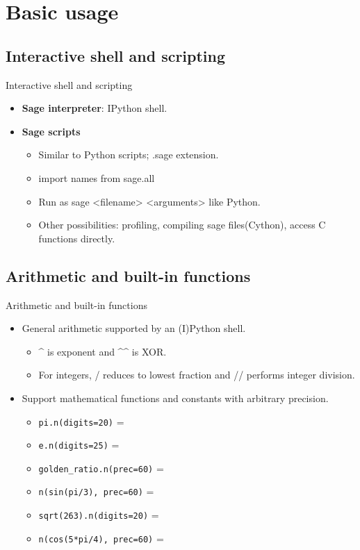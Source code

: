 \documentclass{beamer}
\begin{document}
\section{Basic usage}
\subsection{Interactive shell and scripting}
\begin{frame}{Interactive shell and scripting}
  \begin{itemize}
   \item \textbf{Sage interpreter}: IPython shell.
   \item \textbf{Sage scripts}
   \begin{itemize}
    \item Similar to Python scripts; .sage extension.
    \item import names from sage.all
    \item Run as sage <filename> <arguments> like Python.
    \item Other possibilities: profiling, compiling sage files(Cython), access C functions directly.
   \end{itemize}
  \end{itemize}
\end{frame}

\subsection{Arithmetic and built-in functions}
\begin{frame}[fragile]{Arithmetic and built-in functions}
  \begin{itemize}
   \item General arithmetic supported by an (I)Python shell.
   \begin{itemize}
    \item \textasciicircum \hspace{0pt} is exponent and \textasciicircum\textasciicircum \hspace{0pt} is XOR.
    \item For integers, / reduces to lowest fraction and // performs integer division.
   \end{itemize}
   \item Support mathematical functions and constants with arbitrary precision.
   \begin{itemize}
    \item \verb+pi.n(digits=20)+ = 
    \item \verb+e.n(digits=25)+ = 
    \item \verb+golden_ratio.n(prec=60)+ = 
    \item \verb+n(sin(pi/3), prec=60)+ = 
    \item \verb+sqrt(263).n(digits=20)+ = 
    \item \verb+n(cos(5*pi/4), prec=60)+ = 
   \end{itemize}
  \end{itemize}
\end{frame}
\end{document}
